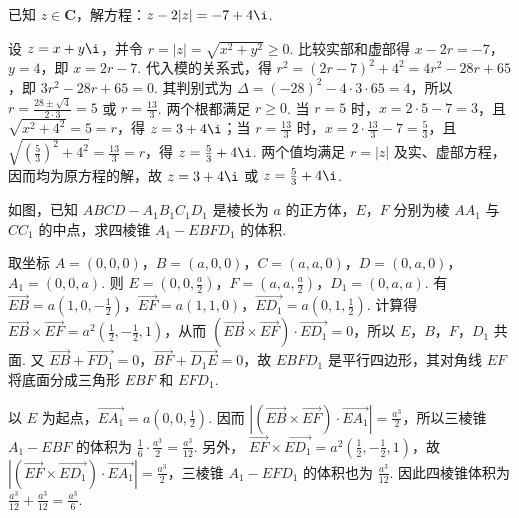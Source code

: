 \documentclass[UTF8,a4paper,oneside,11pt]{ctexbook}
\begin{document}
\begin{problem}
已知 \(z \in \mathbf{C}\)，解方程：\(z - 2|z| = -7 + 4\i\).

\begin{solution}
设 \(z=x+y\i\)，并令 \(r=|z|=\sqrt{x^2+y^2}\geqslant0\). 比较实部和虚部得 \(x-2r=-7\)，\(y=4\)，即 \(x=2r-7\). 代入模的关系式，得
\(r^2=(2r-7)^2+4^2=4r^2-28r+65\)，即 \(3r^2-28r+65=0\). 其判别式为 \(\Delta=(-28)^2-4\cdot3\cdot65=4\)，所以
\(r=\frac{28\pm\sqrt{4}}{2\cdot3}=5\) 或 \(r=\frac{13}{3}\). 两个根都满足 \(r\geqslant0\). 当 \(r=5\) 时，\(x=2\cdot5-7=3\)，且 \(\sqrt{x^2+4^2}=5=r\)，得 \(z=3+4\i\)；当 \(r=\frac{13}{3}\) 时，\(x=2\cdot\frac{13}{3}-7=\frac{5}{3}\)，且 \(\sqrt{\left(\frac{5}{3}\right)^2+4^2}=\frac{13}{3}=r\)，得 \(z=\frac{5}{3}+4\i\). 两个值均满足 \(r=|z|\) 及实、虚部方程，因而均为原方程的解，故 \(z=3+4\i\) 或 \(z=\frac{5}{3}+4\i\).
\end{solution}
\end{problem}

\begin{problem}
如图，已知 \(ABCD-A_{1}B_{1}C_{1}D_{1}\) 是棱长为 \(a\) 的正方体，\(E\)，\(F\) 分别为棱 \(AA_{1}\) 与 \(CC_{1}\) 的中点，求四棱锥 \(A_{1}-EBFD_{1}\) 的体积.


\begin{solution}
取坐标 \(A=(0,0,0)\)，\(B=(a,0,0)\)，\(C=(a,a,0)\)，\(D=(0,a,0)\)，\(A_1=(0,0,a)\). 则 \(E=\left(0,0,\frac{a}{2}\right)\)，\(F=\left(a,a,\frac{a}{2}\right)\)，\(D_1=(0,a,a)\). 有
\(\overrightarrow{EB}=a\left(1,0,-\frac12\right)\)，\(\overrightarrow{EF}=a(1,1,0)\)，\(\overrightarrow{ED_1}=a\left(0,1,\frac12\right)\). 计算得
\(\overrightarrow{EB}\times\overrightarrow{EF}=a^2\left(\frac12,-\frac12,1\right)\)，从而 \(\left(\overrightarrow{EB}\times\overrightarrow{EF}\right)\cdot\overrightarrow{ED_1}=0\)，所以 \(E\)，\(B\)，\(F\)，\(D_1\) 共面. 又 \(\overrightarrow{EB}+\overrightarrow{FD_1}=0\)，\(\overrightarrow{BF}+\overrightarrow{D_1E}=0\)，故 \(EBFD_1\) 是平行四边形，其对角线 \(EF\) 将底面分成三角形 \(EBF\) 和 \(EFD_1\).

以 \(E\) 为起点，\(\overrightarrow{EA_1}=a\left(0,0,\frac12\right)\). 因而
\(\left|\left(\overrightarrow{EB}\times\overrightarrow{EF}\right)\cdot\overrightarrow{EA_1}\right|=\frac{a^3}{2}\)，所以三棱锥 \(A_1-EBF\) 的体积为 \(\frac{1}{6}\cdot\frac{a^3}{2}=\frac{a^3}{12}\). 另外，
\(\overrightarrow{EF}\times\overrightarrow{ED_1}=a^2\left(\frac12,-\frac12,1\right)\)，故
\(\left|\left(\overrightarrow{EF}\times\overrightarrow{ED_1}\right)\cdot\overrightarrow{EA_1}\right|=\frac{a^3}{2}\)，三棱锥 \(A_1-EFD_1\) 的体积也为 \(\frac{a^3}{12}\). 因此四棱锥体积为 \(\frac{a^3}{12}+\frac{a^3}{12}=\frac{a^3}{6}\).
\end{solution}
\end{problem}
\end{document}

